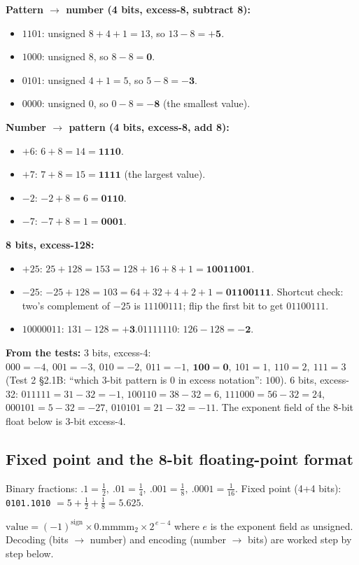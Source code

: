 \documentclass{fkt-notes}
\begin{document}
\noindent\textbf{Pattern $\to$ number (4 bits, excess-8, subtract 8):}
\begin{itemize}[nosep]
  \item $1101$: unsigned $8+4+1=13$, so $13-8=\mathbf{+5}$.
  \item $1000$: unsigned $8$, so $8-8=\mathbf{0}$.
  \item $0101$: unsigned $4+1=5$, so $5-8=\mathbf{-3}$.
  \item $0000$: unsigned $0$, so $0-8=\mathbf{-8}$ (the smallest value).
\end{itemize}
\noindent\textbf{Number $\to$ pattern (4 bits, excess-8, add 8):}
\begin{itemize}[nosep]
  \item $+6$: $6+8=14=\mathbf{1110}$.
  \item $+7$: $7+8=15=\mathbf{1111}$ (the largest value).
  \item $-2$: $-2+8=6=\mathbf{0110}$.
  \item $-7$: $-7+8=1=\mathbf{0001}$.
\end{itemize}
\noindent\textbf{8 bits, excess-128:}
\begin{itemize}[nosep]
  \item $+25$: $25+128=153=128+16+8+1=\mathbf{10011001}$.
  \item $-25$: $-25+128=103=64+32+4+2+1=\mathbf{01100111}$.
        Shortcut check: two's complement of $-25$ is $11100111$; flip the first bit to get $01100111$. \checkmark
  \item $10000011$: $131-128=\mathbf{+3}$.\quad $01111110$: $126-128=\mathbf{-2}$.
\end{itemize}
\textbf{From the tests:} 3 bits, excess-4: $000=-4,\ 001=-3,\ 010=-2,\ 011=-1,\ \mathbf{100=0},\ 101=1,\ 110=2,\ 111=3$
(Test 2 \S2.1B: ``which 3-bit pattern is $0$ in excess notation'': $100$).
6 bits, excess-32: $011111=31-32=-1$, $100110=38-32=6$, $111000=56-32=24$,
$000101=5-32=-27$, $010101=21-32=-11$.
The exponent field of the 8-bit float below is 3-bit excess-4.

\subsection{Fixed point and the 8-bit floating-point format}
Binary fractions: $.1=\frac12,\ .01=\frac14,\ .001=\frac18,\ .0001=\frac1{16}$.
Fixed point (4+4 bits): \texttt{0101.1010} $=5+\frac12+\frac18=5.625$.

\begin{rulebox}[title={The course's 8-bit float: sign (1) | exponent (3, excess-4) | mantissa (4)}]
  $\text{value}=(-1)^{\text{sign}}\times 0.\text{mmmm}_2\times2^{\,e-4}$ where $e$ is the exponent field as unsigned.
  Decoding (bits $\to$ number) and encoding (number $\to$ bits) are worked step by step below.
\end{rulebox}
\end{document}
